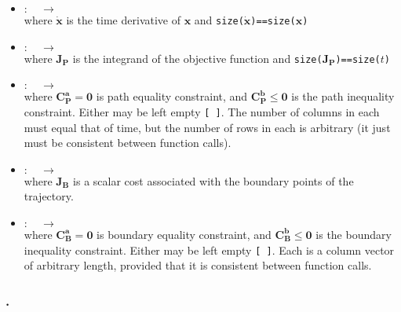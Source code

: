\begin{itemize} \setlength\itemsep{-0.1em}
\item {}
	${\bm: \quad \to \quad }$
	\\ where $\bm{\dot{x}}$ is the time derivative of $\bm{x}$ and \texttt{size($\bm{\dot{x}}$)==size($\bm{x}$)}
\item {}
	${\bm: \quad \to \quad }$
	\\ where $\bm{J_P}$ is the integrand of the objective function and \texttt{size($\bm{J_P}$)==size($t$)}
\item {}
	${\bm: \quad \to \quad }$
	\tc{$\bm{[C_P^a, C_P^b ]}$ = }
	\\ where $\bm{C_P^a}=\bm{0}$ is path equality constraint, and $\bm{C_P^b} \leq \bm{0}$ is the path inequality constraint. Either may be left empty \texttt{[ ]}. 	 	The 	number of columns in each must equal that of time, but the number of rows in each is arbitrary (it just must be consistent between function calls).
\item {}
	${\bm: \quad \to \quad }$
	\\ where $\bm{J_B}$ is a scalar cost associated with the boundary points of the trajectory. 
\item {}
	${\bm: \quad \to \quad }$
	\tc{$\bm{[C_B^a, C_B^b] }$ = }
	\\ where $\bm{C_B^a}=\bm{0}$ is boundary equality constraint, and $\bm{C_B^b} \leq \bm{0}$ is the boundary inequality constraint. Either may be left empty \texttt{[ ]}. Each is a column vector of arbitrary length, provided that it is consistent between function calls.
\end{itemize}


\subsubsection*{.}

